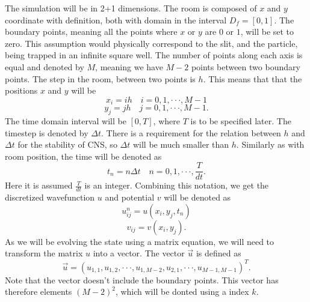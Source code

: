 \documentclass[english,notitlepage,reprint,nofootinbib]{revtex4-1}  %
\begin{document}
The simulation will be in 2+1 dimensions. The room is composed of $x$ and $y$ coordinate with definition, both with domain in the interval $D_f=[0,1]$. The boundary points, meaning all the points where $x$ or $y$ are $0$ or $1$, will be set to zero. This assumption would physically correspond to the slit, and the particle, being trapped in an infinite square well. The number of points along each axis is equal and denoted by $M$, meaning we have $M-2$ points between two boundary points. The step in the room, between two points is $h$. This means that that the positions $x$ and $y$ will be
$$ x_i = i h \quad i=0,1,\cdot \cdot \cdot, M-1$$
$$ y_j = j h \quad j=0,1,\cdot \cdot \cdot, M-1.$$
The time domain interval will be $[0,T]$, where $T$ is to be specified later. The timestep is denoted by $\Delta t$. There is a requirement for the relation between $h$ and $\Delta t$ for the stability of CNS, so $\Delta t$ will be much smaller than $h$. Similarly as with room position, the time will be denoted as
$$ t_n = n \Delta t \quad n=0,1,\cdot \cdot \cdot, \frac{T}{dt}.$$
Here it is assumed $\frac{T}{dt}$ is an integer. Combining this notation, we get the discretized wavefunction $u$ and potential $v$ will be denoted as 
$$ u_{ij}^n = u(x_i, y_j, t_n) $$
$$ v_{ij} = v(x_i, y_j). $$
As we will be evolving the state using a matrix equation, we will need to transform the matrix $u$ into a vector. The vector $\vec{u}$ is defined as
\begin{equation}
    \vec{u} = (u_{1,1},u_{1,2},\cdot \cdot \cdot, u_{1,M-2}, u_{2,1}, \cdot \cdot \cdot, u_{M-1,M-1})^T.
\end{equation}
Note that the vector doesn't include the boundary points. This vector has therefore elements $(M-2)^2$, which will be donted using a index $k$. 
\end{document}
